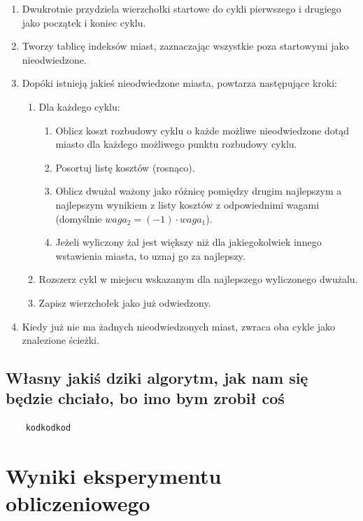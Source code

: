 \documentclass[11pt]{article}
\begin{document}
\begin{enumerate}
    \item Dwukrotnie przydziela wierzchołki startowe do cykli pierwszego i drugiego jako początek i koniec cyklu.
    \item Tworzy tablicę indeksów miast, zaznaczając wszystkie poza startowymi jako nieodwiedzone.
    \item Dopóki istnieją jakieś nieodwiedzone miasta, powtarza następujące kroki:
    \begin{enumerate}
        \item Dla każdego cyklu:
        \begin{enumerate}
            \item Oblicz koszt rozbudowy cyklu o każde możliwe nieodwiedzone dotąd miasto dla każdego możliwego punktu rozbudowy cyklu.
            \item Posortuj listę kosztów (rosnąco).
            \item Oblicz dwużal ważony jako różnicę pomiędzy drugim najlepszym a najlepszym wynikiem z listy kosztów z odpowiednimi wagami (domyślnie $waga_2 = (-1) \cdot waga_1$).
            \item Jeżeli wyliczony żal jest większy niż dla jakiegokolwiek innego wstawienia miasta, to uznaj go za najlepszy.
        \end{enumerate}
        \item Rozszerz cykl w miejscu wskazanym dla najlepszego wyliczonego dwużalu.
        \item Zapisz wierzchołek jako już odwiedzony.
    \end{enumerate}
    \item Kiedy już nie ma żadnych nieodwiedzonych miast, zwraca oba cykle jako znalezione ścieżki.
\end{enumerate}

\subsection{Własny jakiś dziki algorytm, jak nam się będzie chciało, bo imo bym zrobił coś}\label{subsec:wasny-jakis-dziki-algorytm-jak-nam-sie-bedzie-chciao-bo-imo-bym-zrobi-cos}

\begin{verbatim}
    kodkodkod
\end{verbatim}


\section{Wyniki eksperymentu obliczeniowego}\label{sec:wyniki-eksperymenty-obliczeniowego}
\end{document}
